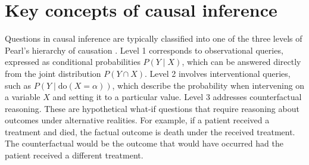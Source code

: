 \section{Key concepts of causal inference}



Questions in causal inference are typically classified into one of the three levels of Pearl's hierarchy of causation \citep{pearl_book2009}. Level 1 corresponds to observational queries, expressed as conditional probabilities $P(Y \mid X)$, which can be answered directly from the joint distribution $P(Y \cap X)$. Level 2 involves interventional queries, such as $P(Y \mid \text{do}(X = \alpha))$, which describe the probability when intervening on a variable $X$ and setting it to a particular value. Level 3 addresses counterfactual reasoning. These are hypothetical what-if questions that require reasoning about outcomes under alternative realities. For example, if a patient received a treatment and died, the factual outcome is death under the received treatment. The counterfactual would be the outcome that would have occurred had the patient received a different treatment.

 


